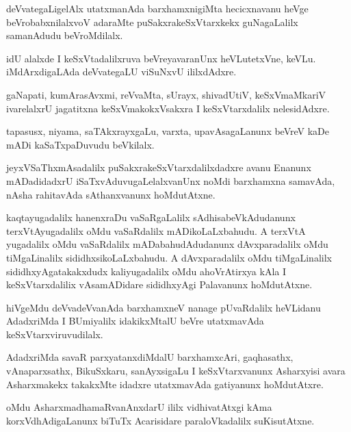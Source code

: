 \documentclass{article}
\begin{document}
\begin{mn}
deVvategaLigelAlx utatxmanAda barxhamxnigiMta hecicxnavanu heVge
beVrobabxnilalxvoV adaraMte puSakxrakeSxVtarxkekx guNagaLalilx
samanAdudu beVroMdilalx.
\end{mn}

\begin{mn}
idU alalxde I keSxVtadalilxruva beVreyavaranUnx heVLutetxVne,
keVLu. iMdArxdigaLAda deVvategaLU viSuNxvU ililxdAdxre.
\end{mn}

\begin{mn}%
gaNapati, kumArasAvxmi, reVvaMta, sUrayx, shivadUtiV, keSxVmaMkariV
ivarelalxrU jagatitxna keSxVmakokxVsakxra I keSxVtarxdalilx nelesidAdxre.
\end{mn}

\begin{mn}
tapasusx, niyama, saTAkxrayxgaLu, varxta, upavAsagaLanunx beVreV kaDe
mADi kaSaTxpaDuvudu beVkilalx.
\end{mn}

\begin{mn}
jeyxVSaThxmAsadalilx puSakxrakeSxVtarxdalilxdadxre avanu Enanunx
mADadidadxrU iSaTxvAduvugaLelalxvanUnx noMdi barxhamxna samavAda,
nAsha rahitavAda sAthanxvanunx hoMdutAtxne.
\end{mn}

\begin{mn}%
kaqtayugadalilx hanenxraDu vaSaRgaLalilx sAdhisabeVkAdudanunx
terxVtAyugadalilx oMdu vaSaRdalilx mADikoLaLxbahudu. A terxVtA
yugadalilx oMdu vaSaRdalilx mADabahudAdudanunx dAvxparadalilx oMdu
tiMgaLinalilx sididhxsikoLaLxbahudu. A dAvxparadalilx oMdu
tiMgaLinalilx sididhxyAgatakakxdudx kaliyugadalilx oMdu ahoVrAtirxya
kAla I keSxVtarxdalilix vAsamADidare sididhxyAgi Palavanunx hoMdutAtxne.
\end{mn}

\begin{mn}%
hiVgeMdu deVvadeVvanAda barxhamxneV nanage pUvaRdalilx heVLidanu
AdadxriMda I BUmiyalilx idakikxMtalU beVre utatxmavAda keSxVtarxviruvudilalx.
\end{mn}

\begin{mn}%
AdadxriMda savaR parxyatanxdiMdalU barxhamxcAri, gaqhasathx,
vAnaparxsathx, BikuSxkaru, sanAyxsigaLu I keSxVtarxvanunx Asharxyisi
avara Asharxmakekx takakxMte idadxre utatxmavAda gatiyanunx hoMdutAtxre.
\end{mn}

\begin{mn}
oMdu AsharxmadhamaRvanAnxdarU ililx vidhivatAtxgi kAma
korxVdhAdigaLanunx biTuTx Acarisidare paraloVkadalilx suKisutAtxne.
\end{mn}
\end{document}
